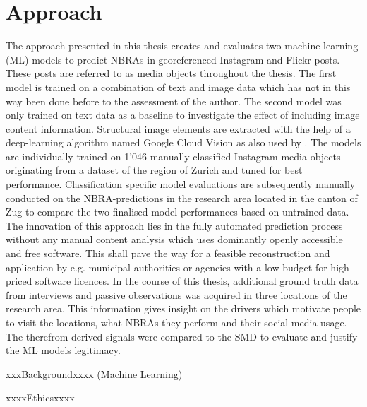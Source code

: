 \section{Approach}
The approach presented in this thesis creates and evaluates two machine learning (ML) models to predict NBRAs in georeferenced Instagram and Flickr posts. These posts are referred to as media objects throughout the thesis. The first model is trained on a combination of text and image data which has not in this way been done before to the assessment of the author. The second model was only trained on text data as a baseline to investigate the effect of including image content information. Structural image elements are extracted with the help of a deep-learning algorithm named Google Cloud Vision as also used by \textcite{Richards2018}. The models are individually trained on 1'046 manually classified Instagram media objects originating from a dataset of the region of Zurich \parencite{Gruzd2016} and tuned for best performance. Classification specific model evaluations are subsequently manually conducted on the NBRA-predictions in the research area located in the canton of Zug to compare the two finalised model performances based on untrained data. The innovation of this approach lies in the fully automated prediction process without any manual content analysis which uses dominantly openly accessible and free software. This shall pave the way for a feasible reconstruction and application by e.g. municipal authorities or agencies with a low budget for high priced software licences.
\newline
In the course of this thesis, additional ground truth data from interviews and passive observations was acquired in three locations of the research area. This information gives insight on the drivers which motivate people to visit the locations, what NBRAs they perform and their social media usage. The therefrom derived signals were compared to the SMD \parencite{Wartmann2018} to evaluate and justify the ML models legitimacy.


xxxBackgroundxxxx (Machine Learning)


xxxxEthicsxxxx
